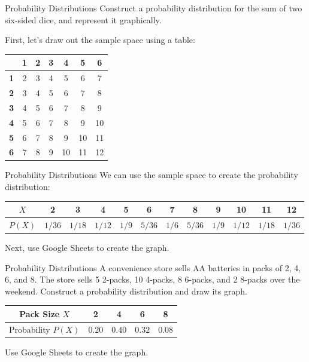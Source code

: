 \documentclass[t, aspectratio=169]{beamer}
\newcommand{\?}{\stackrel{?}{=}}
\begin{document}
	\begin{frame}{Probability Distributions}
		Construct a probability distribution for the sum of two six-sided dice, and represent it graphically. \pause
		
		First, let's draw out the sample space using a table: \pause
		
		\begin{tabular}{|c|c|c|c|c|c|c|} \hline
			 & \textbf{1} & \textbf{2} & \textbf{3} & \textbf{4} & \textbf{5} & \textbf{6} \\ \hline
			 \textbf{1} & 2 & 3 & 4 & 5 & 6 & 7 \\ \hline
			 \textbf{2} & 3 & 4 & 5 & 6 & 7 & 8 \\ \hline
			 \textbf{3} & 4 & 5 & 6 & 7 & 8 & 9 \\ \hline
			 \textbf{4} & 5 & 6 & 7 & 8 & 9 & 10 \\ \hline
			 \textbf{5} & 6 & 7 & 8 & 9 & 10 & 11 \\ \hline
			 \textbf{6} & 7 & 8 & 9 & 10 & 11 & 12 \\ \hline
		\end{tabular}
	\end{frame}

	\begin{frame}{Probability Distributions}
		We can use the sample space to create the probability distribution: \pause
		
		\begin{tabular}{c|ccccccccccc}
			$X$ & 2 & 3 & 4 & 5 & 6 & 7 & 8 & 9 & 10 & 11 & 12 \\ \hline
			$P(X)$ & $1/36$ & $1/18$ & $1/12$ & $1/9$ & $5/36$ & $1/6$ & $5/36$ & $1/9$ & $1/12$ & $1/18$ & $1/36$
		\end{tabular} \pause
	
		Next, use Google Sheets to create the graph.
	\end{frame}

	\begin{frame}{Probability Distributions}
		A convenience store sells AA batteries in packs of 2, 4, 6, and 8. The store sells 5 2-packs, 10 4-packs, 8 6-packs, and 2 8-packs over the weekend. Construct a probability distribution and draw its graph. \pause
		
		\begin{tabular}{c|cccc}
			Pack Size $X$ & 2 & 4 & 6 & 8 \\ \hline
			Probability $P(X)$ \pause & $0.20$ \pause & $0.40$ \pause & $0.32$ \pause & $0.08$ \pause
		\end{tabular}
	
		Use Google Sheets to create the graph.
	\end{frame}
\end{document}
